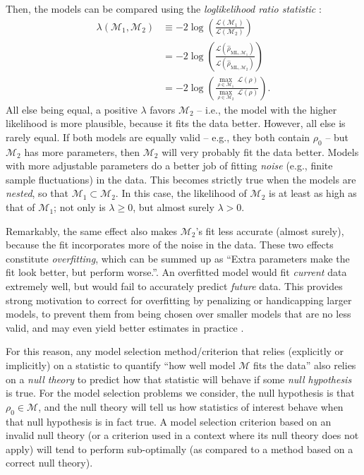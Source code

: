 \documentclass[aps,pra, twocolumn]{revtex4-1}
\newcommand{\M}{\mathcal{M}}
\newcommand{\cL}{\mathcal{L}}
\newcommand{\rhohat}{\hat{\rho}}
\newcommand{\rhoML}[1]{\rhohat_{\scriptscriptstyle{\mathrm{ML},#1}}}
\begin{document}
Then, the models can be compared using the \emph{loglikelihood ratio statistic} \cite{Neyman1933, Blume-Kohout2010, Moroder2013}:
\begin{align}
\nonumber \lambda(\M_{1}, \M_{2}) &\equiv -2 \log \left(\frac{\cL(\M_{1})}{\cL(\M_{2})}\right)\\
\nonumber &= -2 \log \left(\frac{\cL(\rhoML{\M_{1}})}{\cL(\rhoML{\M_{2}})}\right)\\
&= -2 \log \left(\frac{\underset{\rho \in \M_{1}}{\max}~\cL(\rho)}{\underset{\rho \in \M_{2}}{\max}~\cL(\rho)}\right).
\end{align}
All else being equal, a positive $\lambda$ favors $\M_2$ -- i.e., the model with the higher likelihood is more plausible, because it fits the data better.  However, all else is rarely equal.  If both models are equally valid -- e.g., they both contain $\rho_0$ -- but $\M_2$ has more parameters, then $\M_2$ will very probably fit the data better.  Models with more adjustable parameters do a better job of fitting \emph{noise} (e.g., finite sample fluctuations) in the data.  This becomes strictly true when the models are \emph{nested}, so that $\M_{1} \subset \M_{2}$.  In this case, the likelihood of $\M_{2}$ is at least as high as that of $\M_{1}$;  not only is $\lambda \geq 0$, but almost surely $\lambda > 0$.

Remarkably, the same effect also makes $\M_{2}$'s fit less accurate (almost surely), because the fit incorporates more of the noise in the data.  These two effects constitute \emph{overfitting}, which can be summed up as ``Extra parameters make the fit look better, but perform worse.''.  An overfitted model would fit \emph{current} data extremely well,  but would fail to accurately predict \emph{future} data. This provides strong motivation to correct for overfitting by penalizing or handicapping larger models, to prevent them from being chosen over smaller models that are no less valid, and may even yield better estimates in practice \cite{Akaike1974}.

For this reason, any model selection method/criterion that relies (explicitly or implicitly) on a statistic to quantify ``how well model $\M$ fits the data'' also relies on a \emph{null theory} to predict how that statistic will behave if some \emph{null hypothesis} is true. For the model selection problems we consider, the null hypothesis is that $\rho_{0} \in \M$, and the null theory will tell us how statistics of interest behave when that null hypothesis is in fact true.  A model selection criterion based on an invalid null theory (or a criterion used in a context where its null theory does not apply) will tend to perform sub-optimally (as compared to a method based on a correct null theory).
\end{document}
